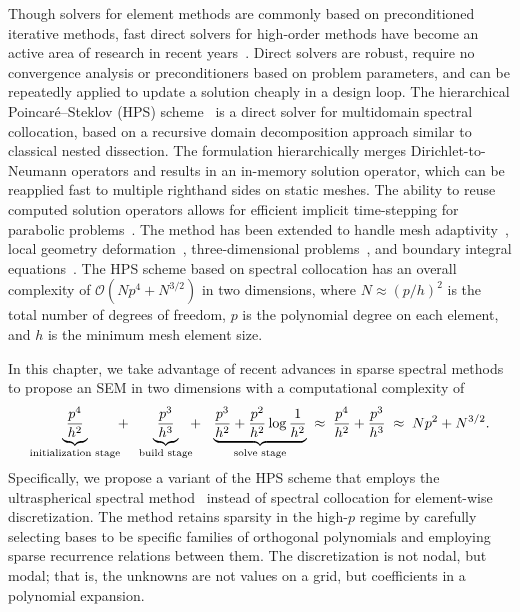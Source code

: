 Though solvers for element methods are commonly based on preconditioned iterative methods, fast direct solvers for high-order methods have become an active area of research in recent years~\cite{Martinsson_19_01}. Direct solvers are robust, require no convergence analysis or preconditioners based on problem parameters, and can be repeatedly applied to update a solution cheaply in a design loop. The hierarchical Poincar\'{e}--Steklov (HPS) scheme~\cite{Martinsson_09_01, Martinsson_13_01, Gillman_14_01, Gillman_14_02, Babb_18_01, Martinsson_19_01} is a direct solver for multidomain spectral collocation, based on a recursive domain decomposition approach similar to classical nested dissection. The formulation hierarchically merges Dirichlet-to-Neumann operators and results in an in-memory solution operator, which can be reapplied fast to multiple righthand sides on static meshes. The ability to reuse computed solution operators allows for efficient implicit time-stepping for parabolic problems~\cite{Babb_20_01,Babb_20_02}. The method has been extended to handle mesh adaptivity~\cite{Geldermans_19_01}, local geometry deformation~\cite{Zhang_18_01}, three-dimensional problems~\cite{Hao_16_01}, and boundary integral equations~\cite{Gillman_15_01}. The HPS scheme based on spectral collocation has an overall complexity of $\mathcal{O}(Np^4 + N^{3/2})$ in two dimensions, where $N \approx (p/h)^2$ is the total number of degrees of freedom, $p$ is the polynomial degree on each element, and $h$ is the minimum mesh element size.

In this chapter, we take advantage of recent advances in sparse spectral methods to propose an SEM in two dimensions with a computational complexity of
\vspace{0.2em}
\[
 \underbrace{\frac{p^4}{h^2}}_{\text{initialization stage}} \!\!+\;\; \underbrace{\frac{p^3}{h^3}}_{\text{build stage}} \!\!+\;\;\, \underbrace{\frac{p^3}{h^2} + \frac{p^2}{h^2}\log \frac{1}{h^2}}_{\text{solve stage}} \;\approx\; \frac{p^4}{h^2} + \frac{p^3}{h^3} \;\approx\; Np^2 + N^{3/2}.\vspace{0.2em}
\]
Specifically, we propose a variant of the HPS scheme that employs the ultraspherical spectral method~\cite{Olver_13_01,Townsend_15_01} instead of spectral collocation for element-wise discretization. The method retains sparsity in the high-$p$ regime by carefully selecting bases to be specific families of orthogonal polynomials and employing sparse recurrence relations between them. The discretization is not nodal, but modal; that is, the unknowns are not values on a grid, but coefficients in a polynomial expansion.

